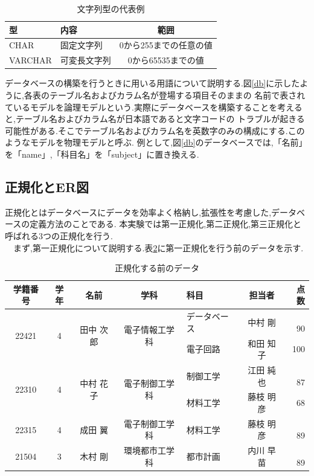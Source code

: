 \documentclass[a4j]{jarticle}
\begin{document}
    \begin{table}[H]
      \caption{文字列型の代表例}
      \label{string}
      \begin{center}
        \begin{tabular}{l|l|c}\hline
          型 & 内容 & 範囲 \\ \hline \hline
          CHAR & 固定文字列 & 0から255までの任意の値 \\ \hline
          VARCHAR & 可変長文字列 & 0から65535までの値 \\ \hline
         \end{tabular}
      \end{center}
      \end{table}

    データベースの構築を行うときに用いる用語について説明する.図\ref{db}に示したように,各表のテーブル名およびカラム名が登場する項目そのままの
    名前で表されているモデルを論理モデルという.実際にデータベースを構築することを考えると,テーブル名およびカラム名が日本語であると文字コードの
    トラブルが起きる可能性がある.そこでテーブル名およびカラム名を英数字のみの構成にする.このようなモデルを物理モデルと呼ぶ.
    例として,図\ref{db}のデータベースでは,「名前」を「name」,「科目名」を「subject」に置き換える.
    \subsection{正規化とER図}
      正規化とはデータベースにデータを効率よく格納し,拡張性を考慮した,データベースの定義方法のことである.
      本実験では第一正規化,第二正規化,第三正規化と呼ばれる3つの正規化を行う.\\
      　まず,第一正規化について説明する.表\ref{before}に第一正規化を行う前のデータを示す.
      \begin{table}[H]
        \caption{正規化する前のデータ}
        \label{before}
        \begin{center}
          \begin{tabular}{c|c|c|c|l|c|r}\hline
            学籍番号 & 学年 & 名前 & 学科 & 科目 & 担当者 & 点数  \\ \hline \hline
            \multirow{2}{*}{22421} & \multirow{2}{*}{4} &\multirow{2}{*}{田中 次郎} & \multirow{2}{*}{電子情報工学科} & データベース & 中村 剛 &　90  \\ \cline{5-7}
            &  &  &  & 電子回路 & 和田 知子 & 100 \\ \hline
            \multirow{2}{*}{22310} & \multirow{2}{*}{4} &\multirow{2}{*}{中村 花子} & \multirow{2}{*}{電子制御工学科} & 制御工学 & 江田 純也 &　87  \\ \cline{5-7}
            &  &  &  & 材料工学 & 藤枝 明彦 & 68 \\ \hline
            22315 & 4 & 成田 翼 & 電子制御工学科 & 材料工学 & 藤枝 明彦 &　89  \\ \hline
            21504 & 3 & 木村 剛 & 環境都市工学科 & 都市計画 & 内川 早苗 &　89  \\ \hline
           \end{tabular}
        \end{center}
        \end{table}
\end{document}
